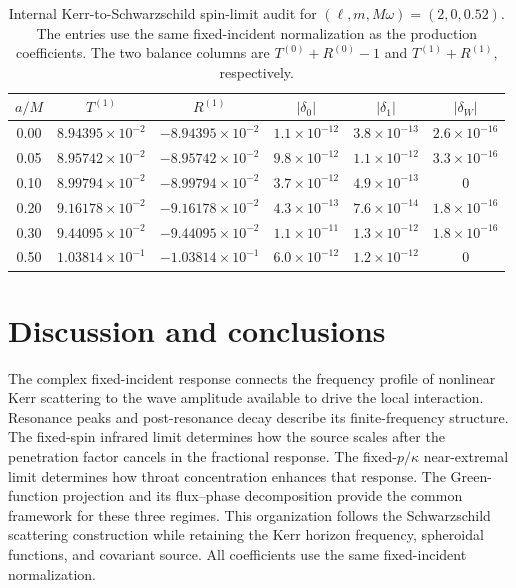 \documentclass[aps,prd,twocolumn,10pt,nofootinbib,superscriptaddress,floatfix]{revtex4-2}
\begin{document}
\begin{table}[t]
\caption{Internal Kerr-to-Schwarzschild spin-limit audit for
$(\ell,m,M\omega)=(2,0,0.52)$.  The entries use the same fixed-incident
normalization as the production coefficients.  The two balance columns are
$T^{(0)}+R^{(0)}-1$ and $T^{(1)}+R^{(1)}$, respectively.}
\label{tab:spin-limit}
\begin{ruledtabular}
\begin{tabular}{c c c c c c}
$a/M$ & $T^{(1)}$ & $R^{(1)}$ & $|\delta_0|$ & $|\delta_1|$ & $|\delta_W|$\\
\hline
0.00 & $8.94395\times10^{-2}$ & $-8.94395\times10^{-2}$ & $1.1\times10^{-12}$ & $3.8\times10^{-13}$ & $2.6\times10^{-16}$\\
0.05 & $8.95742\times10^{-2}$ & $-8.95742\times10^{-2}$ & $9.8\times10^{-12}$ & $1.1\times10^{-12}$ & $3.3\times10^{-16}$\\
0.10 & $8.99794\times10^{-2}$ & $-8.99794\times10^{-2}$ & $3.7\times10^{-12}$ & $4.9\times10^{-13}$ & $0$\\
0.20 & $9.16178\times10^{-2}$ & $-9.16178\times10^{-2}$ & $4.3\times10^{-13}$ & $7.6\times10^{-14}$ & $1.8\times10^{-16}$\\
0.30 & $9.44095\times10^{-2}$ & $-9.44095\times10^{-2}$ & $1.1\times10^{-11}$ & $1.3\times10^{-12}$ & $1.8\times10^{-16}$\\
0.50 & $1.03814\times10^{-1}$ & $-1.03814\times10^{-1}$ & $6.0\times10^{-12}$ & $1.2\times10^{-12}$ & $0$\\
\end{tabular}
\end{ruledtabular}
\end{table}

\section{Discussion and conclusions}

The complex fixed-incident response connects the frequency profile of
nonlinear Kerr scattering to the wave amplitude available to drive the
local interaction.  Resonance peaks and post-resonance decay describe its
finite-frequency structure.  The fixed-spin infrared limit determines how
the source scales after the penetration factor cancels in the fractional
response.  The fixed-$p/\kappa$ near-extremal limit determines how throat
concentration enhances that response.  The Green-function projection and
its flux--phase decomposition provide the common framework for these
three regimes.  This organization follows the Schwarzschild scattering
construction while retaining the Kerr horizon frequency, spheroidal
functions, and covariant source.  All coefficients use the same
fixed-incident normalization.
\end{document}
